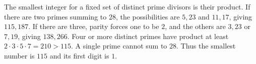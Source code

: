 The smallest integer for a fixed set of distinct prime divisors is their product. If there are two primes summing to $28$, the possibilities are $5,23$ and $11,17$, giving $115,187$. If there are three, parity forces one to be $2$, and the others are $3,23$ or $7,19$, giving $138,266$. Four or more distinct primes have product at least $2\cdot3\cdot5\cdot7=210>115$. A single prime cannot sum to $28$. Thus the smallest number is $115$ and its first digit is $\boxed1$.
